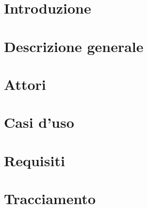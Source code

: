 \documentclass[a4paper, oneside, openany, dvipsnames, table]{article}
\begin{document}
\copertina{}


\newpage

\tableofcontents
\newpage
\listoftables
\newpage
\listoffigures

\newpage
\section{Introduzione}\label{sec:Introduzione}


\newpage
\section{Descrizione generale}\label{sec:Descrizione-generale}


\newpage
\section{Attori}\label{sec:Attori}


\section{Casi d'uso}\label{sec:casi-d-uso}


\newpage
\section{Requisiti}\label{sec:requisiti}


\newpage
\section{Tracciamento}\label{sec:tracciamento}

\end{document}

